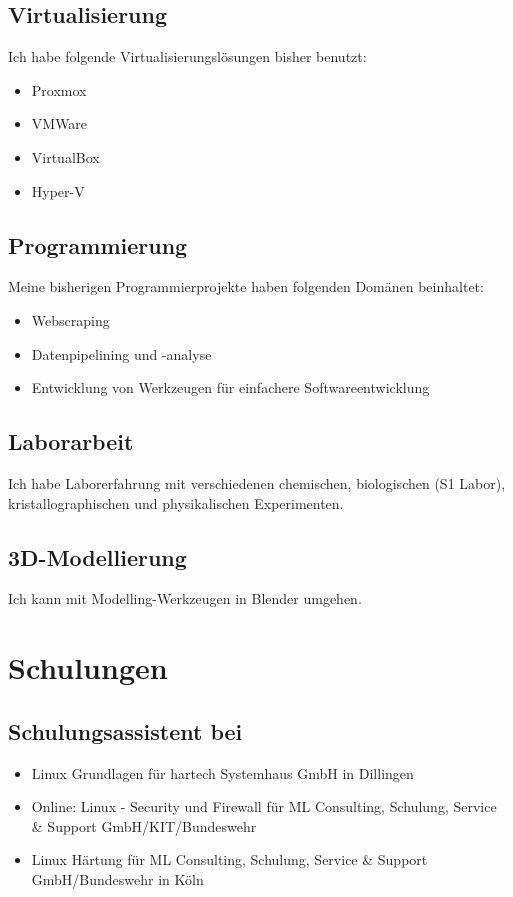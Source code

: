 \documentclass{article}
\begin{document}
\subsection{Virtualisierung}
Ich habe folgende Virtualisierungslösungen bisher benutzt:
\begin{itemize}
	\item Proxmox
	\item VMWare
	\item VirtualBox
	\item Hyper-V
\end{itemize}

\subsection{Programmierung}
Meine bisherigen Programmierprojekte haben folgenden Domänen beinhaltet:
\begin{itemize}
	\item Webscraping
	\item Datenpipelining und -analyse
	\item Entwicklung von Werkzeugen für einfachere Softwareentwicklung
\end{itemize}

\subsection{Laborarbeit}
Ich habe Laborerfahrung mit verschiedenen chemischen, biologischen (S1 Labor), kristallographischen und physikali\-schen Experimenten.

\subsection{3D-Modellierung}
Ich kann mit Modelling-Werkzeugen in Blender umgehen.

\section{Schulungen}

\subsection{Schulungsassistent bei}

\begin{itemize}
\item Linux Grundlagen für hartech Systemhaus GmbH in Dillingen
\item Online: Linux - Security und Firewall für ML Consulting, Schulung, Service \& Support GmbH/KIT/Bundeswehr
\item Linux Härtung für ML Consulting, Schulung, Service \& Support GmbH/Bundeswehr in Köln
\end{itemize}
\end{document}
